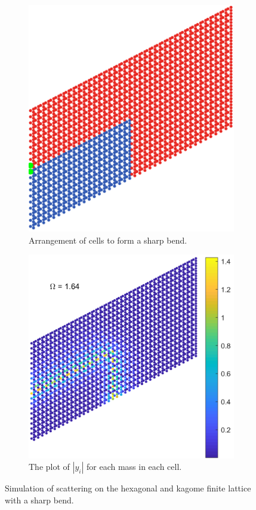 \begin{figure}[!h]
\medskip
\centering
\begin{subfigure}[b]{.5\textwidth}
  \centering
  \includegraphics[width=0.8\linewidth]{imgs/kagomesharpbendarr.png}
  \caption{Arrangement of cells to form a sharp bend.}
  \label{fig:sub1}
\end{subfigure}%
\begin{subfigure}[b]{.5\textwidth}
  \centering
  \includegraphics[width=1\linewidth]{imgs/kagomesharpbendscat.png}
  \caption{The plot of $|y_i|$ for each mass in each cell.}
  \label{fig:sub2}
\end{subfigure}
\caption{Simulation of scattering on the hexagonal and kagome finite lattice
  with a sharp bend.}
\label{fig:sharpbend}
\end{figure}


